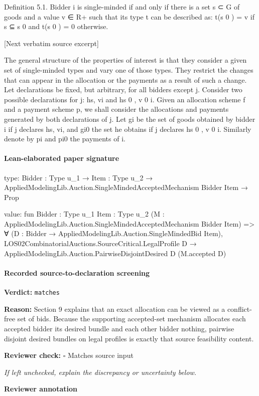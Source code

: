 \documentclass[10pt]{article}
\newcommand{\reviewerbox}{%
  \par\noindent\fbox{\parbox{0.96\linewidth}{\rule{0pt}{0.38in}}}\par
}
\newcommand{\reviewmatch}[1]{%
  \par\noindent\textbf{Reviewer check:} $\square$\; #1\par
  \noindent\emph{If left unchecked, explain the discrepancy or uncertainty below.}\par
}
\begin{document}
\begin{ReviewVerbatim}

Definition 5.1. Bidder i is single-minded if and only if there is a set s ⊂ G of
goods and a value v ∈ R+ such that its type t can be described as: t(s 0 ) = v if s ⊆ s 0
and t(s 0 ) = 0 otherwise.

[Next verbatim source excerpt]

The general structure of the properties of interest is that they consider a given
set of single-minded types and vary one of those types. They restrict the changes
that can appear in the allocation or the payments as a result of such a change.
Let declarations be fixed, but arbitrary, for all bidders except j. Consider two
possible declarations for j: hs, vi and hs 0 , v 0 i. Given an allocation scheme f and a
payment scheme p, we shall consider the allocations and payments generated by
both declarations of j. Let gi be the set of goods obtained by bidder i if j declares
hs, vi, and gi0 the set he obtains if j declares hs 0 , v 0 i. Similarly denote by pi and pi0
the payments of i.
\end{ReviewVerbatim}



\paragraph{Lean-elaborated paper signature}
\begin{ReviewVerbatim}
type:
{Bidder : Type u_1} → {Item : Type u_2} → AppliedModelingLib.Auction.SingleMindedAcceptedMechanism Bidder Item → Prop

value:
fun {Bidder : Type u_1} {Item : Type u_2} (M : AppliedModelingLib.Auction.SingleMindedAcceptedMechanism Bidder Item) =>
  ∀ (D : Bidder → AppliedModelingLib.Auction.SingleMindedBid Item),
    LOS02CombinatorialAuctions.SourceCritical.LegalProfile D →
      AppliedModelingLib.Auction.PairwiseDisjointDesired D (M.accepted D)
\end{ReviewVerbatim}


\paragraph{Recorded source-to-declaration screening}
\textbf{Verdict:} \texttt{matches}
\\
{\raggedright
\textbf{Reason:} Section 9 explains that an exact allocation can be viewed as a conflict-\allowbreak{}free set of bids.\allowbreak{} Because the supporting accepted-\allowbreak{}set mechanism allocates each accepted bidder its desired bundle and each other bidder nothing, pairwise disjoint desired bundles on legal profiles is exactly that source feasibility content.\allowbreak{}
\par}
\reviewmatch{Matches source input}
\noindent\textbf{Reviewer annotation}\par
\reviewerbox
\clearpage
\hypertarget{paper-prerequisite-1004d1cac266ec58}{}
\end{document}
